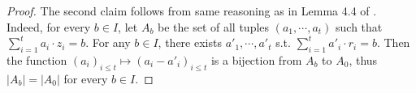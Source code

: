 \documentclass[11pt]{article}
\newcommand{\poly}[2]{{#1}^{<#2}[x]}
\newcommand{\negl}[1]{\text{negl}(#1)}
\newtheorem{theorem}{Theorem}[section]
\begin{document}
\begin{proof}
The second claim follows from same reasoning as in Lemma 4.4 of \cite{Mic12}. Indeed, for every $b \in I$, let $A_b$ be the set of all
tuples $(a_1,\cdots, a_t) $ such that $\sum_{i=1}^t a_i \cdot z_i = b$. For any $b\in I$, there exists $a'_1,\cdots, a'_t$ s.t. $\sum_{i=1}^t a'_i \cdot r_i = b$. Then the function $(a_i)_{i\leq t} \mapsto (a_i-a'_i)_{i \leq t}$ is a bijection from $A_b$ to $A_0$, thus $|A_b| = |A_0|$ for every $b\in I$.
\end{proof}
 


\end{document}
